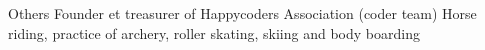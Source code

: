 






\begin{rubric}{Others}
  \entry*
  Founder et treasurer of Happycoders Association (coder team)
  \entry*
  Horse riding, practice of archery, roller skating, skiing and body boarding
\end{rubric}
